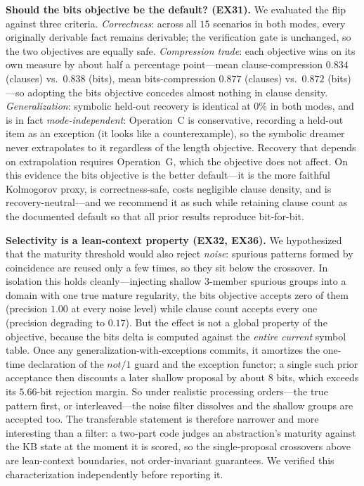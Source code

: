 \documentclass[10pt,conference]{IEEEtran}
\begin{document}
\textbf{Should the bits objective be the default? (EX31).} We evaluated the flip against three criteria. \emph{Correctness}: across all $15$ scenarios in both modes, every originally derivable fact remains derivable; the verification gate is unchanged, so the two objectives are equally safe. \emph{Compression trade}: each objective wins on its own measure by about half a percentage point---mean clause-compression $0.834$ (clauses) vs.\ $0.838$ (bits), mean bits-compression $0.877$ (clauses) vs.\ $0.872$ (bits)---so adopting the bits objective concedes almost nothing in clause density. \emph{Generalization}: symbolic held-out recovery is identical at $0\%$ in both modes, and is in fact \emph{mode-independent}: Operation~C is conservative, recording a held-out item as an exception (it looks like a counterexample), so the symbolic dreamer never extrapolates to it regardless of the length objective. Recovery that depends on extrapolation requires Operation~G, which the objective does not affect. On this evidence the bits objective is the better default---it is the more faithful Kolmogorov proxy, is correctness-safe, costs negligible clause density, and is recovery-neutral---and we recommend it as such while retaining clause count as the documented default so that all prior results reproduce bit-for-bit.

\textbf{Selectivity is a lean-context property (EX32, EX36).} We hypothesized that the maturity threshold would also reject \emph{noise}: spurious patterns formed by coincidence are reused only a few times, so they sit below the crossover. In isolation this holds cleanly---injecting shallow $3$-member spurious groups into a domain with one true mature regularity, the bits objective accepts zero of them (precision $1.00$ at every noise level) while clause count accepts every one (precision degrading to $0.17$). But the effect is not a global property of the objective, because the bits delta is computed against the \emph{entire current} symbol table. Once any generalization-with-exceptions commits, it amortizes the one-time declaration of the $\mathit{not}/1$ guard and the exception functor; a single such prior acceptance then discounts a later shallow proposal by about $8$ bits, which exceeds its $5.66$-bit rejection margin. So under realistic processing orders---the true pattern first, or interleaved---the noise filter dissolves and the shallow groups are accepted too. The transferable statement is therefore narrower and more interesting than a filter: a two-part code judges an abstraction's maturity against the KB state at the moment it is scored, so the single-proposal crossovers above are lean-context boundaries, not order-invariant guarantees. We verified this characterization independently before reporting it.
\end{document}

